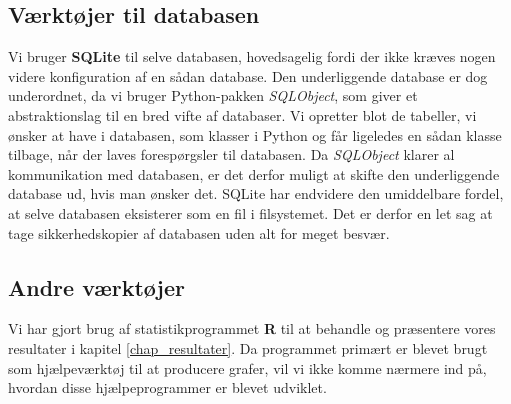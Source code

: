 {\subsection{Værktøjer til databasen}
Vi bruger \textbf{SQLite}\cite{Sqlite} til selve databasen, hovedsagelig
fordi der ikke kræves nogen videre konfiguration af en sådan database.
Den underliggende database er dog underordnet, da vi bruger
Python-pakken \emph{SQLObject}\cite{Sqlobject}, som giver et
abstraktionslag til en bred vifte af databaser. Vi opretter blot de
tabeller, vi ønsker at have i databasen, som klasser i Python og får
ligeledes en sådan klasse tilbage, når der laves forespørgsler til
databasen. Da \emph{SQLObject} klarer al kommunikation med databasen, er
det derfor muligt at skifte den underliggende database ud, hvis man
ønsker det. SQLite har endvidere den umiddelbare fordel, at selve
databasen eksisterer som en fil i filsystemet.  Det er derfor en let sag
at tage sikkerhedskopier af databasen uden alt for meget besvær.

\subsection{Andre værktøjer}
Vi har gjort brug af statistikprogrammet \textbf{R}\cite{Rlang} til at
behandle og præsentere vores resultater i kapitel \ref{chap_resultater}.
Da programmet primært er blevet brugt som hjælpeværktøj til at
producere grafer, vil vi ikke komme nærmere ind på, hvordan disse
hjælpeprogrammer er blevet udviklet.

}

